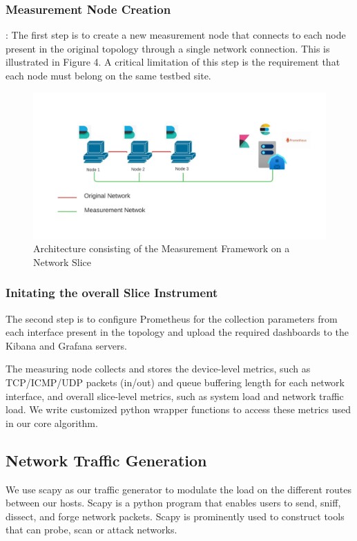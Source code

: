 \documentclass[conference]{IEEEtran}
\begin{document}
    \subsubsection{Measurement Node Creation}: The first step is to create a new measurement node that connects to each node present in the original topology through a single network connection. This is illustrated in Figure 4. A critical limitation of this step is the requirement that each node must belong on the same testbed site.
    
    \begin{figure}[h]
        \includegraphics[scale=0.45]{Mflib.jpeg}
        \centering
        \caption{Architecture consisting of the Measurement Framework on a Network Slice}
    \end{figure}
    
    \subsubsection{Initating the overall Slice Instrument} The second step is to configure Prometheus for the collection parameters from each interface present in the topology and upload the required dashboards to the Kibana and Grafana servers.

    
    The measuring node collects and stores the device-level metrics, such as TCP/ICMP/UDP packets (in/out) and queue buffering length for each network interface, and overall slice-level metrics, such as system load and network traffic load. We write customized python wrapper functions to access these metrics used in our core algorithm.

    \subsection{Network Traffic Generation}
    We use scapy as our traffic generator to modulate the load on the different routes between our hosts. Scapy is a python program that enables users to send, sniff, dissect, and forge network packets. Scapy is prominently used to construct tools that can probe, scan or attack networks.
\end{document}
